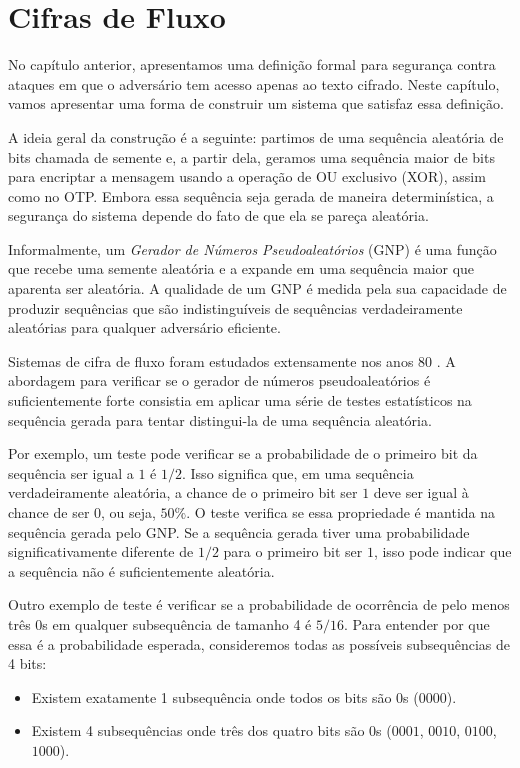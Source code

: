 \chapter{Cifras de Fluxo}
\label{cha:cifras-de-fluxo}

No capítulo anterior, apresentamos uma definição formal para segurança contra ataques em que o adversário tem acesso apenas ao texto cifrado.
Neste capítulo, vamos apresentar uma forma de construir um sistema que satisfaz essa definição.

A ideia geral da construção é a seguinte:
partimos de uma sequência aleatória de bits chamada de semente e, a partir dela, geramos uma sequência maior de bits para encriptar a mensagem usando a operação de OU exclusivo (XOR), assim como no OTP.
Embora essa sequência seja gerada de maneira determinística, a segurança do sistema depende do fato de que ela se pareça aleatória.

Informalmente, um {\em Gerador de Números Pseudoaleatórios} (GNP) é uma função que recebe uma semente aleatória e a expande em uma sequência maior que aparenta ser aleatória.
A qualidade de um GNP é medida pela sua capacidade de produzir sequências que são indistinguíveis de sequências verdadeiramente aleatórias para qualquer adversário eficiente.

Sistemas de cifra de fluxo foram estudados extensamente nos anos 80 \cite{Blum84,Yao82}.
A abordagem para verificar se o gerador de números pseudoaleatórios é suficientemente forte consistia em aplicar uma série de testes estatísticos na sequência gerada para tentar distingui-la de uma sequência aleatória.

Por exemplo, um teste pode verificar se a probabilidade de o primeiro bit da sequência ser igual a $1$ é $1/2$.
Isso significa que, em uma sequência verdadeiramente aleatória, a chance de o primeiro bit ser $1$ deve ser igual à chance de ser $0$, ou seja, $50\%$.
O teste verifica se essa propriedade é mantida na sequência gerada pelo GNP.
Se a sequência gerada tiver uma probabilidade significativamente diferente de $1/2$ para o primeiro bit ser $1$, isso pode indicar que a sequência não é suficientemente aleatória.

Outro exemplo de teste é verificar se a probabilidade de ocorrência de pelo menos três $0$s em qualquer subsequência de tamanho 4 é $5/16$.
Para entender por que essa é a probabilidade esperada, consideremos todas as possíveis subsequências de 4 bits:

\begin{itemize}
\item Existem exatamente 1 subsequência onde todos os bits são $0$s ($0000$).
\item Existem 4 subsequências onde três dos quatro bits são $0$s ($0001$, $0010$, $0100$, $1000$).
\end{itemize}

